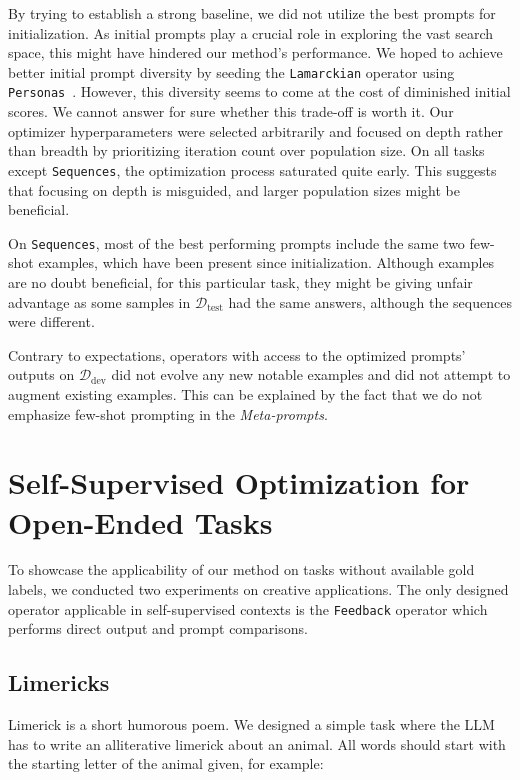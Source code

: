 By trying to establish a strong baseline, we did not utilize the best prompts for initialization. 
As initial prompts play a crucial role\cite{yang2024dualphaseacceleratedpromptoptimization} in exploring the vast search space,
this might have hindered our method's performance. We hoped to achieve better initial prompt diversity by seeding the \texttt{Lamarckian} operator using \texttt{Personas}~\cite{ge2024scalingsyntheticdatacreation}.
However, this diversity seems to come at the cost of diminished initial scores. We cannot answer for sure whether this trade-off is worth it. 
\newpage
Our optimizer hyperparameters were selected arbitrarily and focused on depth rather than breadth by prioritizing iteration count over population size.
On all tasks except \texttt{Sequences}, the optimization process saturated quite early. This suggests that focusing on depth is misguided,
and larger population sizes might be beneficial.

On \texttt{Sequences}, most of the best performing prompts include the same two few-shot examples, which have been present since initialization.
Although examples are no doubt beneficial, for this particular task, they might be giving unfair advantage as some 
samples in $\mathcal{D}_{\text{test}}$ had the same answers, although the sequences were different. 

Contrary to expectations, operators with access to the optimized prompts' outputs on $\mathcal{D}_{\text{dev}}$ did not evolve any new notable examples
and did not attempt to augment existing examples. This can be explained by the fact that we do not emphasize few-shot prompting in the \textit{Meta-prompts}.

\section{Self-Supervised Optimization for Open-Ended Tasks}
To showcase the applicability of our method on tasks without available gold labels, we conducted two experiments
on creative applications. The only designed operator applicable in self-supervised contexts is the \texttt{Feedback} 
operator which performs direct output and prompt comparisons.

\subsection{Limericks}
Limerick is a short humorous poem. We designed a simple task where the LLM has to write an alliterative limerick about an animal. 
All words should start with the starting letter of the animal given, for example:

